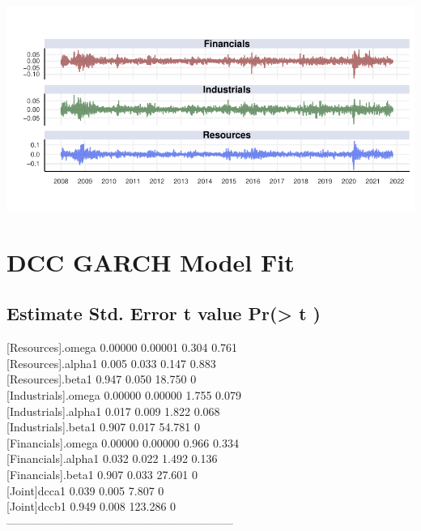 \documentclass[11pt,preprint, authoryear]{elsarticle}
\let\origfigure\figure
\let\endorigfigure\endfigure
\renewenvironment{figure}[1][2] {
    \expandafter\origfigure\expandafter[H]
} {
    \endorigfigure
}
\numberwithin{equation}{section}
\numberwithin{figure}{section}
\numberwithin{table}{section}
\begin{document}
\begin{figure}[H]

{\centering \includegraphics{Paper_files/figure-latex/LogRet-1} 

}

\caption{Log Returns per Sector for the SWIX \label{LogRet}}\label{fig:LogRet}
\end{figure}

\hypertarget{dcc-garch-model-fit}{%
\section{DCC GARCH Model Fit}\label{dcc-garch-model-fit}}

\hypertarget{estimate-std.-error-t-value-pr-t}{%
\subsection{Estimate Std. Error t value Pr(\textgreater{} \textbar{}
t\textbar{} )}\label{estimate-std.-error-t-value-pr-t}}

{[}Resources{]}.omega 0.00000 0.00001 0.304 0.761\\
{[}Resources{]}.alpha1 0.005 0.033 0.147 0.883\\
{[}Resources{]}.beta1 0.947 0.050 18.750 0\\
{[}Industrials{]}.omega 0.00000 0.00000 1.755 0.079\\
{[}Industrials{]}.alpha1 0.017 0.009 1.822 0.068\\
{[}Industrials{]}.beta1 0.907 0.017 54.781 0\\
{[}Financials{]}.omega 0.00000 0.00000 0.966 0.334\\
{[}Financials{]}.alpha1 0.032 0.022 1.492 0.136\\
{[}Financials{]}.beta1 0.907 0.033 27.601 0\\
{[}Joint{]}dcca1 0.039 0.005 7.807 0\\
{[}Joint{]}dccb1 0.949 0.008 123.286 0\\
------------------------------------------------------------
\end{document}
